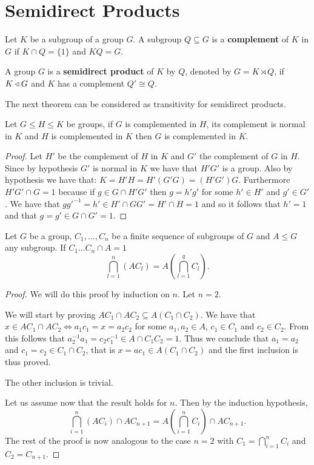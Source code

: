 \section{Semidirect Products}

\begin{definition}
    Let $K$ be a subgroup of a group $G$. A subgroup $Q \subseteq G$ is a \textbf{complement} of $K$ in $G$ if $K \cap Q = \{1\}$ and $KQ = G$.
\end{definition}

\begin{definition}
    A group $G$ is a \textbf{semidirect product} of $K$ by $Q$, denoted by $G = K \rtimes Q$, if $K \triangleleft G$ and $K$ has a complement $Q' \cong Q$.

\end{definition}

The next theorem can be considered as transitivity for semidirect products.

\begin{theorem}
\label{smdptrans}
Let $G \le H \le K$ be groups, if $G$ is complemented in $H$, its complement is normal in $K$ and $H$ is complemented in $K$ then $G$ is complemented in $K$.
\end{theorem}

\begin{proof}
    \label{S1:SPE}
    Let $H'$ be the complement of $H$ in $K$ and $G'$ the complement of $G$ in $H$. Since by hypothesis $G'$ is normal in $K$ we have that $H'G'$ is a group. Also by hypothesis we have that:
    $K = H'H =H'(G'G) = (H'G')G$.
    Furthermore $H'G' \cap G = 1$ because if $g \in G \cap H'G'$ then $g = h'g'$ for some $h' \in H'$ and $g' \in G'$. We have that $gg'^{-1} = h' \in H' \cap GG' = H' \cap H = 1$ and so it follows that $h' = 1$ and that $g = g' \in G \cap G' = 1$.
\end{proof}

\begin{theorem}
    Let $G$ be a group, $C_1, ..., C_n$ be a  finite sequence of subgroups of $G$ and $A \le G$ any subgroup. If $C_1...C_n \cap A = 1$
    $$
    \bigcap_{l = 1}^{n}(AC_l) = A(\bigcap_{l = 1}^{q}C_l).
    $$
\end{theorem}

\begin{proof}
    We will do this proof by induction on $n$.
    Let $n = 2$. 
    
    We will start by proving $AC_1 \cap AC_2 \subseteq A(C_1 \cap C_2)$.
    We have that $x \in AC_1 \cap AC_2 \iff a_1c_1 = x = a_2c_2$ for some $a_1, a_2 \in A$, $c_1 \in C_1$ and $c_2 \in C_2$. From this follows that $a_2^{-1}a_1 = c_2c_1^{-1} \in A \cap C_1C_2 = 1$. Thus we conclude that $a_1 = a_2$ and $c_1 = c_2 \in C_1 \cap C_2$, that is $x = ac_1 \in A(C_1 \cap C_2)$ and the first inclusion is thus proved. 

    The other inclusion is trivial.

    Let us assume now that the result holds for $n$. 
    Then by the induction hypothesis,
    $$
    \bigcap_{i = 1}^{n}(AC_i) \cap AC_{n+1} = A(\bigcap_{i = 1}^{n}C_i) \cap AC_{n+1}.
    $$
    The rest of the proof is now analogous to the case $n = 2$ with $C_1 = \bigcap_{i = 1}^{n}C_i$ and $C_2 = C_{n+1}$.
\end{proof}